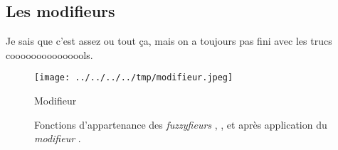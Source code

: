 %   


\subsection{Les modifieurs}

Je sais que c'est assez ou tout ça, mais on a toujours pas fini avec les trucs cooooooooooooools.



\begin{figure}
  \centering
  \texttt{[image: ../../../../tmp/modifieur.jpeg]}
  \caption{Modifieur}
  \label{fig:methode_modifieur}
\end{figure}


\begin{figure}
  \centering
  
  \hfill  
  \caption{Fonctions d'appartenance des \emph{fuzzyfieurs}
    \protect{}, \protect{}, et
    \protect{} après application du
    \emph{modifieur} \protect{}.}
  \label{fig:fnc_not}
\end{figure}

